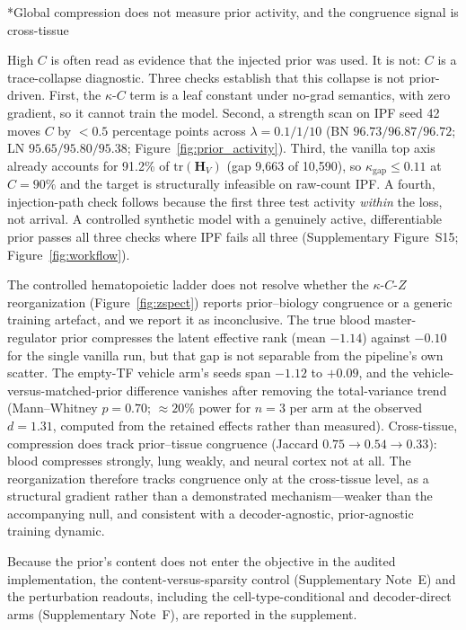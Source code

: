 \documentclass[11pt,a4paper]{article}
\makeatletter
\renewcommand{\subsection}{\@startsection{subsection}{2}{0pt}{10pt plus 4pt}{4pt}{\normalsize\bfseries}}
\newcommand{\Hmat}{\mathbf{H}}\newcommand{\Wmat}{\mathbf{W}}\newcommand{\Jmat}{\mathbf{J}}
\makeatother
\begin{document}
\subsection*{Global compression does not measure prior activity, and the congruence signal is cross-tissue}

High $C$ is often read as evidence that the injected prior was used. It is not: $C$ is a trace-collapse diagnostic. Three checks establish that this collapse is not prior-driven. First, the $\kappa$-$C$ term is a
leaf constant under no-grad semantics, with zero gradient, so it cannot train the model. Second, a
strength scan on IPF seed 42 moves $C$ by $<0.5$ percentage points across $\lambda=0.1/1/10$ (BN
$96.73/96.87/96.72$; LN $95.65/95.80/95.38$; Figure~\ref{fig:prior_activity}). Third, the vanilla
top axis already accounts for 91.2\% of $\mathrm{tr}(\Hmat_V)$ (gap 9,663 of 10,590), so
$\kappa_{\mathrm{gap}}\leq0.11$ at $C=90\%$ and the target is structurally infeasible on raw-count
IPF. A fourth, injection-path check follows because the first three test activity \emph{within} the loss, not arrival. A controlled synthetic model with a genuinely active, differentiable prior passes all three checks where IPF fails all three (Supplementary Figure~S15; Figure~\ref{fig:workflow}).

The controlled hematopoietic ladder does not resolve whether the $\kappa$-$C$-$Z$
reorganization (Figure~\ref{fig:zspect}) reports prior--biology congruence or a generic training
artefact, and we report it as inconclusive. The true blood master-regulator prior compresses the
latent effective rank (mean $-1.14$) against $-0.10$ for the single vanilla run, but that gap is
not separable from the pipeline's own scatter. The empty-TF vehicle arm's seeds span $-1.12$ to
$+0.09$, and the vehicle-versus-matched-prior difference vanishes after removing the
total-variance trend (Mann--Whitney $p=0.70$; $\approx20\%$ power for $n=3$ per arm at the observed $d=1.31$, computed from the retained effects rather than measured). Cross-tissue, compression does track prior--tissue congruence (Jaccard $0.75\to0.54\to0.33$): blood compresses strongly, lung weakly, and neural cortex not at all. The reorganization therefore tracks congruence only at the cross-tissue level, as a structural gradient rather than a demonstrated mechanism---weaker than the accompanying null, and consistent with a decoder-agnostic, prior-agnostic training dynamic.

Because the prior's content does not enter the objective in the audited implementation, the content-versus-sparsity control (Supplementary Note~E) and the perturbation readouts, including the cell-type-conditional and decoder-direct arms (Supplementary Note~F), are reported in the supplement.
\end{document}
